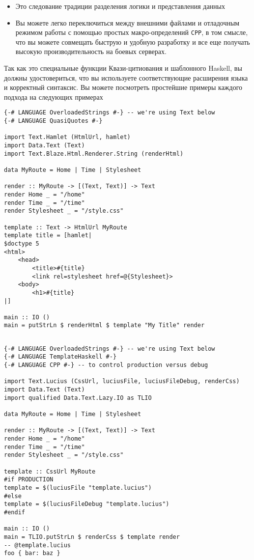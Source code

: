 \begin{itemize}
\item Это следование традиции разделения логики и представления данных
\item Вы можете легко переключиться между внешними файлами и отладочным режимом
работы с помощью простых макро-определений \texttt{CPP}, в том смысле, что вы
можете совмещать быструю и удобную разработку и все еще получать высокую
производительность на боевых серверах.
\end{itemize}

Так как это специальные функции Квази-цитиования и шаблонного Haskell, вы 
должны удостовериться, что вы используете соответствующие расширения языка
и корректный синтаксис. Вы можете посмотреть простейшие примеры каждого подхода
на следующих примерах

\begin{lstlisting}
{-# LANGUAGE OverloadedStrings #-} -- we're using Text below
{-# LANGUAGE QuasiQuotes #-}

import Text.Hamlet (HtmlUrl, hamlet)
import Data.Text (Text)
import Text.Blaze.Html.Renderer.String (renderHtml)

data MyRoute = Home | Time | Stylesheet

render :: MyRoute -> [(Text, Text)] -> Text
render Home _ = "/home"
render Time _ = "/time"
render Stylesheet _ = "/style.css"

template :: Text -> HtmlUrl MyRoute
template title = [hamlet|
$doctype 5
<html>
    <head>
        <title>#{title}
        <link rel=stylesheet href=@{Stylesheet}>
    <body>
        <h1>#{title}
|]

main :: IO ()
main = putStrLn $ renderHtml $ template "My Title" render
\end{lstlisting}

\begin{lstlisting}

{-# LANGUAGE OverloadedStrings #-} -- we're using Text below
{-# LANGUAGE TemplateHaskell #-}
{-# LANGUAGE CPP #-} -- to control production versus debug

import Text.Lucius (CssUrl, luciusFile, luciusFileDebug, renderCss)
import Data.Text (Text)
import qualified Data.Text.Lazy.IO as TLIO

data MyRoute = Home | Time | Stylesheet

render :: MyRoute -> [(Text, Text)] -> Text
render Home _ = "/home"
render Time _ = "/time"
render Stylesheet _ = "/style.css"

template :: CssUrl MyRoute
#if PRODUCTION
template = $(luciusFile "template.lucius")
#else
template = $(luciusFileDebug "template.lucius")
#endif

main :: IO ()
main = TLIO.putStrLn $ renderCss $ template render
-- @template.lucius
foo { bar: baz }
\end{lstlisting}

